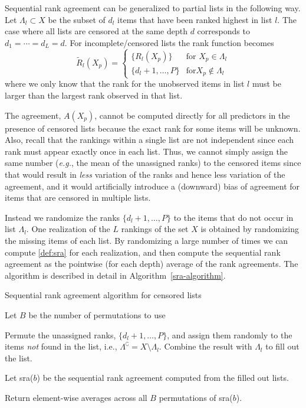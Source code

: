 \documentclass[12pt,a4paper]{article}
\makeatletter
\newcommand{\eg}{\emph{e.g.}\@\xspace}
\theoremstyle{plain}
\makeatother
\begin{document}
Sequential rank agreement can be generalized to partial lists in the
following way. Let $\Lambda_l\subset X$ be the subset of $d_l$ items
that have been ranked highest in list $l$.  The case where all lists are
censored at the same depth $d$ corresponds to $d_1=\cdots=d_L=d$. For
incomplete/censored lists the rank function becomes
\begin{equation}
	\widetilde R_l(X_p) = \begin{cases}
	     \{R_l(X_p)\} & \text{for } X_p\in \Lambda_l\\
	     \{d_l+1,\dots,P\} & \text{for} X_p \not\in \Lambda_l
        \end{cases}
\end{equation}
where we only know that the rank for the unobserved items in list $l$
must be larger than the largest rank observed in that list.

The agreement, $A(X_p)$, cannot be computed directly for all
predictors in the presence of censored lists because the exact rank
for some items will be unknown. Also, recall that the rankings within
a single list are not independent since each rank must appear exactly
once in each list. Thus, we cannot simply assign the same number
(\eg, the mean of the unassigned ranks) to the censored items since
that would result in \emph{less} variation of the ranks and hence less
variation of the agreement, and it would artificially introduce a
(downward) bias of agreement for items that are censored in multiple
lists.

Instead we randomize the ranks $\{d_{l}+1,\dots,P\}$ to the items that
do not occur in list $\Lambda_l$. One realization of the $L$ rankings
of the set $X$ is obtained by randomizing the missing items of each
list. By randomizing a large number of times we can compute
\eqref{def:sra} for each realization, and then compute the sequential
rank agreement as the pointwise (for each depth) average of the rank
agreements. The algorithm is described in detail in
Algorithm~\ref{sra-algorithm}.

\begin{algorithm}
\caption{Sequential rank agreement algorithm for censored lists}
\label{sra-algorithm}
\begin{algorithmic}[1]
   \State Let $B$ be the number
  of permutations to use  
  \State \parbox[t]{\dimexpr\linewidth-\algorithmicindent-1.7cm}{Permute
    the unassigned ranks, $\{d_l+1, \ldots, P\}$, and assign them
    randomly to the items \emph{not} found in the list, i.e.,
    $\Lambda^\complement=X\setminus\Lambda_l$. Combine the
    result with $\Lambda_l$ to fill out the list.}
\EndFor
\State \parbox[t]{\dimexpr\linewidth-\algorithmicindent-1cm}{Let sra($b$) be the sequential rank agreement computed from the
filled out lists.}
\EndFor
\State Return element-wise averages across all $B$ permutations of sra($b$).
\EndProcedure
\end{algorithmic}
\end{algorithm}
\end{document}
